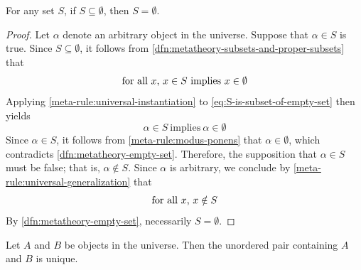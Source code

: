 \begin{thm}
     \label{thm:metatheory-subset-of-an-empty-set-must-be-empty}
    For any set \( S \), if \( S \subseteq \emptyset \), then \( S = \emptyset \).
\end{thm}

\begin{proof}
    Let \( \alpha \) denote an arbitrary object in the universe.
    Suppose that \( \alpha \in S \) is true.
    Since \( S \subseteq \emptyset \), it follows from \cref{dfn:metatheory-subsets-and-proper-subsets} that
    \begin{equation*}
        \text{for all \( x \), \( x \in S \) implies \( x \in \emptyset \)}
    \end{equation*}
    Applying \cref{meta-rule:universal-instantiation} to \eqref{eq:S-is-subset-of-empty-set} then yields
    \begin{equation*}
        \alpha \in S \ \text{implies} \ \alpha \in \emptyset
    \end{equation*}
    Since \( \alpha \in S \), it follows from \cref{meta-rule:modus-ponens} that \( \alpha \in \emptyset \), which
    contradicts \cref{dfn:metatheory-empty-set}.
    Therefore, the supposition that \( \alpha \in S \) must be false; that is, \( \alpha \notin S \).
    Since \( \alpha \) is arbitrary, we conclude by \cref{meta-rule:universal-generalization} that
    \begin{equation*}
        \text{for all \( x \), \( x \notin S \)}
    \end{equation*}
    By \cref{dfn:metatheory-empty-set}, necessarily \( S = \emptyset \).
\end{proof}

\begin{thm}
     \label{thm:metatheory-uniqueness-of-unordered-pair}
    Let \( A \) and \( B \) be objects in the universe. Then the unordered pair containing \( A \) and \( B \) is unique.
\end{thm}

